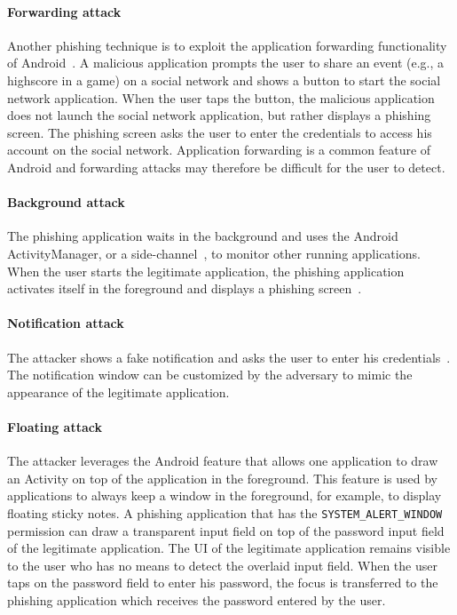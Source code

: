 \paragraph{Forwarding attack} Another phishing technique is to exploit the
application forwarding functionality of Android~\cite{felt11w2sp}. A malicious
application prompts the user to share an event (e.g., a highscore in a game)
on a social network and shows a button to start the social network application.
When the user taps the button, the malicious application does not launch the
social network application, but rather displays a phishing screen. The phishing
screen asks the user to enter the credentials to access his account on the
social network. Application forwarding is a common feature of Android and forwarding attacks may therefore be difficult for the user to detect.

\paragraph{Background attack} The phishing application waits in the background
and uses the Android ActivityManager, or a
side-channel~\cite{lin-ndss14}, to monitor other running applications. When the
user starts the legitimate application, the phishing application activates
itself in the foreground and displays a phishing screen~\cite{bianchi15sp,felt11w2sp}.

\paragraph{Notification attack} The attacker shows a fake notification and
asks the user to enter his credentials~\cite{zu-woot12}. The notification
window can be customized by the adversary to mimic the appearance of the legitimate application.

\paragraph{Floating attack}
The attacker leverages the Android feature that allows one application to draw an Activity on top of the application in the foreground. This feature is used by applications
to always keep a window in the foreground, for example, to display floating
sticky notes. A phishing application that has the
\texttt{SYSTEM\_ALERT\_WINDOW} permission can draw a transparent input field on
top of the password input field of the legitimate application. The UI of the
legitimate application remains visible to the user who has no means to detect
the overlaid input field. When the user taps on the password field to enter his
password, the focus is transferred to the phishing application which receives
the password entered by the user.

